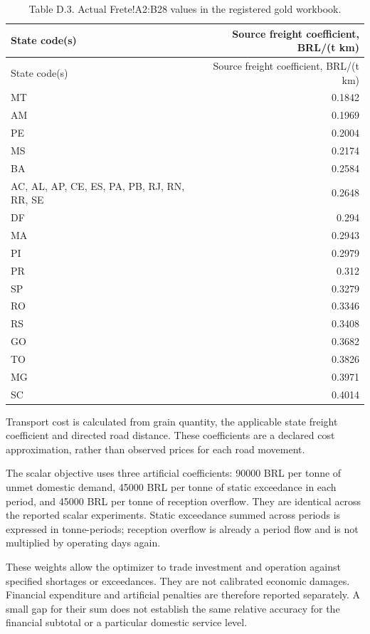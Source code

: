 \documentclass[
  english,
  11pt,
  a4paper,
]{article}
\begin{document}
\begin{longtable}[]{@{}lr@{}}
\caption{Table D.3. Actual Frete!A2:B28 values in the registered gold
workbook.}\tabularnewline
\toprule\noalign{}
State code(s) & Source freight coefficient, BRL/(t km) \\
\midrule\noalign{}
\endfirsthead
\toprule\noalign{}
State code(s) & Source freight coefficient, BRL/(t km) \\
\midrule\noalign{}
\endhead
\bottomrule\noalign{}
\endlastfoot
MT & 0.1842 \\
AM & 0.1969 \\
PE & 0.2004 \\
MS & 0.2174 \\
BA & 0.2584 \\
AC, AL, AP, CE, ES, PA, PB, RJ, RN, RR, SE & 0.2648 \\
DF & 0.294 \\
MA & 0.2943 \\
PI & 0.2979 \\
PR & 0.312 \\
SP & 0.3279 \\
RO & 0.3346 \\
RS & 0.3408 \\
GO & 0.3682 \\
TO & 0.3826 \\
MG & 0.3971 \\
SC & 0.4014 \\
\end{longtable}

Transport cost is calculated from grain quantity, the applicable state
freight coefficient and directed road distance. These coefficients are a
declared cost approximation, rather than observed prices for each road
movement.

The scalar objective uses three artificial coefficients: 90000 BRL per
tonne of unmet domestic demand, 45000 BRL per tonne of static exceedance
in each period, and 45000 BRL per tonne of reception overflow. They are
identical across the reported scalar experiments. Static exceedance
summed across periods is expressed in tonne-periods; reception overflow
is already a period flow and is not multiplied by operating days again.

These weights allow the optimizer to trade investment and operation
against specified shortages or exceedances. They are not calibrated
economic damages. Financial expenditure and artificial penalties are
therefore reported separately. A small gap for their sum does not
establish the same relative accuracy for the financial subtotal or a
particular domestic service level.
\end{document}
